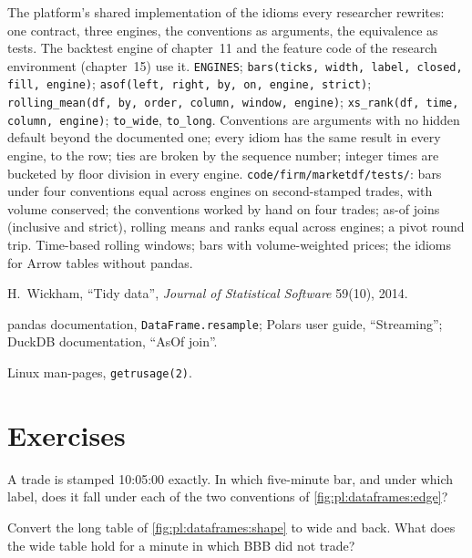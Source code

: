 \begin{build}
 The platform's shared implementation of the idioms every researcher rewrites: one contract, three engines, the
conventions as arguments, the equivalence as tests. The backtest engine of chapter~11 and the feature code of the research environment
(chapter~15) use it.
 \texttt{ENGINES}; \texttt{bars(ticks, width, label, closed, fill, engine)}; \texttt{asof(left, right, by, on,
engine, strict)}; \texttt{rolling\_mean(df, by, order, column, window, engine)}; \texttt{xs\_rank(df, time, column, engine)};
\texttt{to\_wide}, \texttt{to\_long}.
 Conventions are arguments with no hidden default beyond the documented one; every idiom has the same result in every
engine, to the row; ties are broken by the sequence number; integer times are bucketed by floor division in every engine.
 \texttt{code/firm/marketdf/tests/}: bars under four conventions equal across engines on second-stamped trades,
with volume conserved; the conventions worked by hand on four trades; as-of joins (inclusive and strict), rolling means and ranks equal
across engines; a pivot round trip.
 Time-based rolling windows; bars with volume-weighted prices; the idioms for Arrow tables without pandas.
\end{build}

\begin{omsources}
\item H.~Wickham, ``Tidy data'', \emph{Journal of Statistical Software} 59(10), 2014.
\item pandas documentation, \texttt{DataFrame.resample}; Polars user guide, ``Streaming''; DuckDB documentation, ``AsOf join''.
\item Linux man-pages, \texttt{getrusage(2)}.
\end{omsources}

\section{Exercises}

\begin{exercise}[$\star$]\label{exo:pl:dataframes:1}
A trade is stamped 10:05:00 exactly. In which five-minute bar, and under which label, does it fall under each of the two conventions
of \cref{fig:pl:dataframes:edge}?
\end{exercise}

\begin{exercise}[$\star$]\label{exo:pl:dataframes:2}
Convert the long table of \cref{fig:pl:dataframes:shape} to wide and back. What does the wide table hold for a minute in which BBB did
not trade?
\end{exercise}

